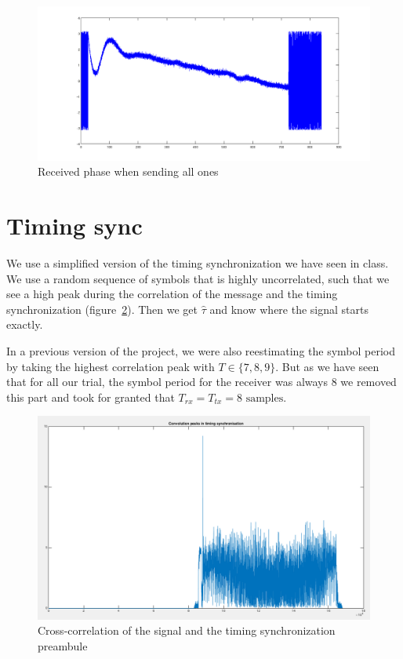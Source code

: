 \documentclass{article}
\begin{document}
\begin{figure}
  \centering\includegraphics[width=\textwidth]{../presentation/phase.png}
  \caption{Received phase when sending all ones}
  \label{fig:phase}
\end{figure}

\section{Timing sync}

We use a simplified version of the timing synchronization we have seen in class. We use a random sequence of symbols that is highly uncorrelated, such that we see a high peak during the correlation of the message and the timing synchronization (figure~\ref{fig:timing}). Then we get $\hat\tau$ and know where the signal starts exactly.

In a previous version of the project, we were also reestimating the symbol period by taking the highest correlation peak with $T\in\{7,8,9\}$. But as we have seen that for all our trial, the symbol period for the receiver was always 8 we removed this part and took for granted that \(T_{rx} = T_{tx} = 8\text{ samples}\).

\begin{figure}
  \centering\includegraphics[width=\textwidth]{../presentation/timing.png}
  \caption{Cross-correlation of the signal and the timing synchronization preambule}
  \label{fig:timing}
\end{figure}
\end{document}
